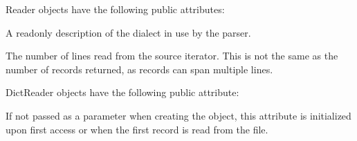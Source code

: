 \documentclass[letterpaper,10pt,english]{sphinxmanual}
\begin{document}
Reader objects have the following public attributes:

\vspace{5px}

\begin{fulllineitems}
\label{\detokenize{csv:csv.csvreader.dialect}}
A read\sphinxhyphen{}only description of the dialect in use by the parser.

\end{fulllineitems}


\vspace{5px}

\begin{fulllineitems}
\label{\detokenize{csv:csv.csvreader.line_num}}
The number of lines read from the source iterator. This is not the same as the
number of records returned, as records can span multiple lines.

\end{fulllineitems}


DictReader objects have the following public attribute:

\vspace{5px}

\begin{fulllineitems}
\label{\detokenize{csv:csv.csvreader.fieldnames}}
If not passed as a parameter when creating the object, this attribute is
initialized upon first access or when the first record is read from the
file.

\end{fulllineitems}
\end{document}
